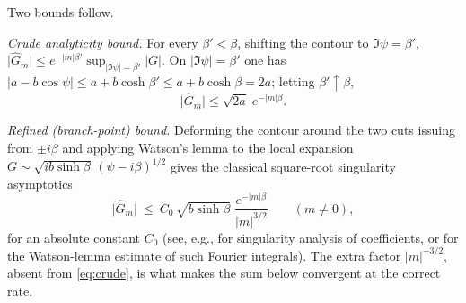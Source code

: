 \documentclass[11pt,reqno]{amsart}
\theoremstyle{definition}
\newcommand{\abs}[1]{\lvert #1\rvert}
\begin{document}
Two bounds follow.

\emph{Crude analyticity bound.} For every $\beta'<\beta$, shifting the contour to $\Im\psi=\beta'$,
$\abs{\widehat G_m}\le e^{-\abs m\beta'}\sup_{\abs{\Im\psi}=\beta'}\abs{G}$. On $\abs{\Im\psi}=\beta'$
one has $\abs{a-b\cos\psi}\le a+b\cosh\beta'\le a+b\cosh\beta=2a$; letting $\beta'\uparrow\beta$,
\begin{equation}\label{eq:crude}
   \abs{\widehat G_m}\le\sqrt{2a}\;e^{-\abs m\beta}.
\end{equation}

\emph{Refined (branch-point) bound.} Deforming the contour around the two cuts issuing from
$\pm i\beta$ and applying Watson's lemma to the local expansion $G\sim\sqrt{ib\sinh\beta}\,
(\psi-i\beta)^{1/2}$ gives the classical square-root singularity asymptotics
\begin{equation}\label{eq:refined}
   \abs{\widehat G_m}\ \le\ C_0\,\sqrt{b\sinh\beta}\;\frac{e^{-\abs m\beta}}{\abs m^{3/2}}
   \qquad(m\ne0),
\end{equation}
for an absolute constant $C_0$ (see, e.g., \cite[Ch.~VI]{FlajoletSedgewick} for singularity
analysis of coefficients, or \cite[Ch.~2]{Wong} for the Watson-lemma estimate of such Fourier
integrals). The extra factor $\abs m^{-3/2}$, absent from \eqref{eq:crude}, is what makes the sum
below convergent at the correct rate.
\end{document}
